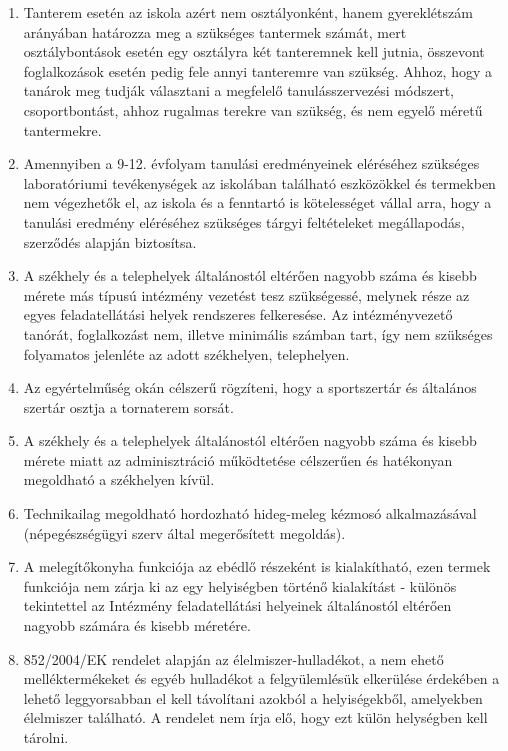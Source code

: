 \begin{enumerate}
\def\labelenumi{\arabic{enumi}.}
\tightlist
\item
  Tanterem esetén az iskola azért nem osztályonként, hanem gyereklétszám
  arányában határozza meg a szükséges tantermek számát, mert
  osztálybontások esetén egy osztályra két tanteremnek kell jutnia,
  összevont foglalkozások esetén pedig fele annyi tanteremre van
  szükség. Ahhoz, hogy a tanárok meg tudják választani a megfelelő
  tanulásszervezési módszert, csoportbontást, ahhoz rugalmas terekre van
  szükség, és nem egyelő méretű tantermekre.
\item
  Amennyiben a 9-12. évfolyam tanulási eredményeinek eléréséhez
  szükséges laboratóriumi tevékenységek az iskolában található
  eszközökkel és termekben nem végezhetők el, az iskola és a fenntartó
  is kötelességet vállal arra, hogy a tanulási eredmény eléréséhez
  szükséges tárgyi feltételeket megállapodás, szerződés alapján
  biztosítsa.
\item
  A székhely és a telephelyek általánostól eltérően nagyobb száma és
  kisebb mérete más típusú intézmény vezetést tesz szükségessé, melynek
  része az egyes feladatellátási helyek rendszeres felkeresése. Az
  intézményvezető tanórát, foglalkozást nem, illetve minimális számban
  tart, így nem szükséges folyamatos jelenléte az adott székhelyen,
  telephelyen.
\item
  Az egyértelműség okán célszerű rögzíteni, hogy a sportszertár és
  általános szertár osztja a tornaterem sorsát.
\item
  A székhely és a telephelyek általánostól eltérően nagyobb száma és
  kisebb mérete miatt az adminisztráció működtetése célszerűen és
  hatékonyan megoldható a székhelyen kívül.
\item
  Technikailag megoldható hordozható hideg-meleg kézmosó alkalmazásával
  (népegészségügyi szerv által megerősített megoldás).
\item
  A melegítőkonyha funkciója az ebédlő részeként is kialakítható, ezen
  termek funkciója nem zárja ki az egy helyiségben történő kialakítást -
  különös tekintettel az Intézmény feladatellátási helyeinek
  általánostól eltérően nagyobb számára és kisebb méretére.
\item
  852/2004/EK rendelet alapján az élelmiszer-hulladékot, a nem ehető
  melléktermékeket és egyéb hulladékot a felgyülemlésük elkerülése
  érdekében a lehető leggyorsabban el kell távolítani azokból a
  helyiségekből, amelyekben élelmiszer található. A rendelet nem írja
  elő, hogy ezt külön helységben kell tárolni.
\end{enumerate}

